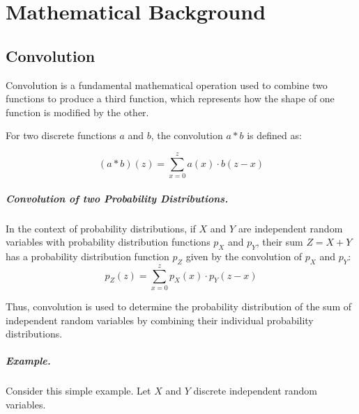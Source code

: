 \documentclass{masterthesis}
\begin{document}
\appendix

\chapter{Mathematical Background} %

\section{Convolution}

Convolution is a fundamental mathematical operation used to combine two functions to produce a third function, which represents how the shape of one function is modified by the other. 

For two discrete functions \(a\) and \(b\), the convolution \(a * b\) is defined as:

\begin{equation}
    (a * b)(z) = \sum_{x=0}^{z} a(x) \cdot b(z - x)
\end{equation}

\paragraph*{Convolution of two Probability Distributions.}
In the context of probability distributions, if \(X\) and \(Y\) are independent random variables with probability distribution functions \(p_X\) and \(p_Y\), their sum \(Z = X + Y\) has a probability distribution function \(p_Z\) given by the convolution of \(p_X\) and \(p_Y\):
\begin{equation}\label{eq:convolution}
    p_Z(z) = \sum_{x=0}^{z} p_X(x) \cdot p_Y(z - x)
\end{equation}

Thus, convolution is used to determine the probability distribution of the sum of independent random variables by combining their individual probability distributions.

\paragraph*{Example.} 

Consider this simple example. Let $X$ and $Y$ discrete independent random variables. 
\end{document}
